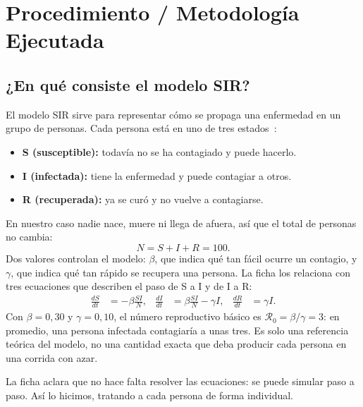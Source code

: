 \documentclass[11pt,a4paper]{article}
\begin{document}
\section{Procedimiento / Metodología Ejecutada}

\subsection{¿En qué consiste el modelo SIR?}
El modelo SIR sirve para representar cómo se propaga una enfermedad en un grupo de personas. Cada persona está en uno de tres estados~\cite{guia}:
\begin{itemize}
  \item \textbf{S (susceptible):} todavía no se ha contagiado y puede hacerlo.
  \item \textbf{I (infectada):} tiene la enfermedad y puede contagiar a otros.
  \item \textbf{R (recuperada):} ya se curó y no vuelve a contagiarse.
\end{itemize}
En nuestro caso nadie nace, muere ni llega de afuera, así que el total de personas no cambia:
\[
N = S + I + R = 100.
\]
Dos valores controlan el modelo: $\beta$, que indica qué tan fácil ocurre un contagio, y $\gamma$, que indica qué tan rápido se recupera una persona. La ficha los relaciona con tres ecuaciones que describen el paso de S a I y de I a R:
\begin{align*}
\frac{dS}{dt} &= -\beta\frac{SI}{N}, &
\frac{dI}{dt} &= \beta\frac{SI}{N} - \gamma I, &
\frac{dR}{dt} &= \gamma I.
\end{align*}
Con $\beta = 0{,}30$ y $\gamma = 0{,}10$, el número reproductivo básico es $\mathcal{R}_0 = \beta/\gamma = 3$: en promedio, una persona infectada contagiaría a unas tres. Es solo una referencia teórica del modelo, no una cantidad exacta que deba producir cada persona en una corrida con azar.

La ficha aclara que no hace falta resolver las ecuaciones: se puede simular paso a paso. Así lo hicimos, tratando a cada persona de forma individual.
\end{document}
